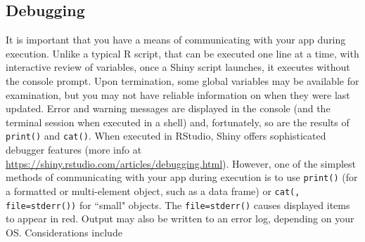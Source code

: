 \documentclass[10pt, letterpaper]{article}
\begin{document}
\begin{spacing}{1.0}

\section{Debugging}\label{sec:debugging}

It is important that you have a means of communicating with your app during execution.  Unlike a typical R script, that can be executed one line at a time, with interactive review of variables, once a Shiny script launches, it executes without the console prompt.  Upon termination, some global variables may be available for examination, but you may not have reliable information on when they were last updated.  Error and warning messages are displayed in the console (and the terminal session when executed in a shell) and, fortunately, so are the results of \texttt{print()} and \texttt{cat()}.  When executed in RStudio, Shiny offers sophisticated debugger features (more info at \url{https://shiny.rstudio.com/articles/debugging.html}).  However, one of the simplest methods of communicating with your app during execution is to use \texttt{print()} (for a formatted or multi-element object, such as a data frame) or \texttt{cat(, file=stderr())} for ``small" objects.  The \texttt{file=stderr()} causes displayed items to appear in red.  Output may also be written to an error log, depending on your OS.  Considerations include


\end{spacing}
\end{document}
